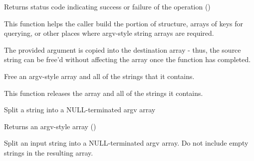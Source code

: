 \begin{arglist}
\end{arglist}

Returns status code indicating success or failure of the operation ()

\descr

This function helps the caller build the  portion of  structure, arrays of keys for querying, or other places where argv-style string arrays are required.

\adviceuserstart
The provided argument is copied into the destination array - thus, the source string can be free'd without affecting the array once the function has completed.
\adviceuserend


Free an argv-style array and all of the strings that it contains.


\begin{arglist}
\end{arglist}

This function releases the array and all of the strings it contains.


Split a string into a NULL-terminated argv array


\begin{arglist}
\end{arglist}

Returns an argv-style array ()

\descr
Split an input string into a NULL-terminated argv array. Do not include empty strings in the resulting array.

